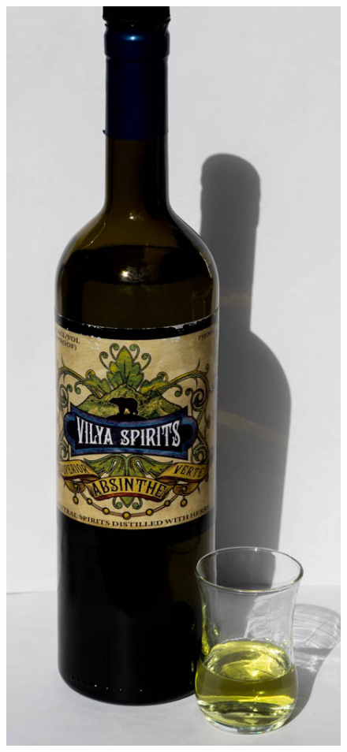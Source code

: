 \documentclass[12pt,letterpaper,oneside]{memoir}
\begin{document}
  \begin{figure}
    \includegraphics[width=\linewidth]{../../assets/tasting/naa-vilya-verte.jpg}
    \vspace{-50pt}
  \end{figure}
\end{document}
